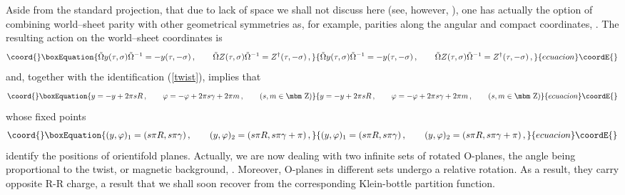 \documentclass[a4paper,12pt]{article}
\def\bb#1{\hbox{\mbm #1}}
\begin{document}
Aside from the standard \myHighlight{$\Omega$}\coordHE{} projection, that due to lack of space 
we shall not discuss here (see, however, \cite{adm}), one has 
actually the option
of combining world--sheet parity with other
geometrical symmetries as, for example, parities along the angular 
\myHighlight{$\varphi$}\coordHE{} and compact \coordHE{} coordinates, \coordHE{}. The resulting action on the world--sheet coordinates \coordHE{} is
\begin{equation}\coord{}\boxEquation{ 
\tilde\Omega y (\tau , \sigma ) \tilde\Omega ^{-1}  = - y(\tau , -\sigma) \,,
\qquad \tilde\Omega Z (\tau , \sigma ) \tilde\Omega ^{-1} = Z^\dagger (\tau ,
-\sigma ) \,,
}{ 
\tilde\Omega y (\tau , \sigma ) \tilde\Omega ^{-1}  = - y(\tau , -\sigma) \,,
\qquad \tilde\Omega Z (\tau , \sigma ) \tilde\Omega ^{-1} = Z^\dagger (\tau ,
-\sigma ) \,,
}{ecuacion}\coordE{}\end{equation}
and, together with the identification (\ref{twist}), implies that 
\begin{equation}\coord{}\boxEquation{
y = - y + 2 \pi s R \,, \qquad \varphi = - \varphi 
+ 2 \pi s \gamma + 2 \pi m \,,
\qquad (s,m \in \bb{Z})
}{
y = - y + 2 \pi s R \,, \qquad \varphi = - \varphi 
+ 2 \pi s \gamma + 2 \pi m \,,
\qquad (s,m \in \bb{Z})
}{ecuacion}\coordE{}\end{equation}
whose fixed points
\begin{equation}\coord{}\boxEquation{
(y , \varphi )_1 = ( s\pi R , s \pi \gamma ) \,, \qquad 
(y , \varphi )_2 = ( s\pi R , s \pi \gamma + \pi ) \,, \label{fixed}
}{
(y , \varphi )_1 = ( s\pi R , s \pi \gamma ) \,, \qquad 
(y , \varphi )_2 = ( s\pi R , s \pi \gamma + \pi ) \,, }{ecuacion}\coordE{}\end{equation}
identify the positions of orientifold planes. Actually, we are now dealing 
with two infinite sets of rotated O-planes, the angle being proportional 
to the twist, or magnetic background, \myHighlight{$\gamma$}\coordHE{}. Moreover, O-planes in 
different sets undergo a relative \myHighlight{$\pi$}\coordHE{} rotation. As a result, they carry
opposite R-R charge, a result that we shall soon recover from the 
corresponding Klein-bottle partition function.
\end{document}
